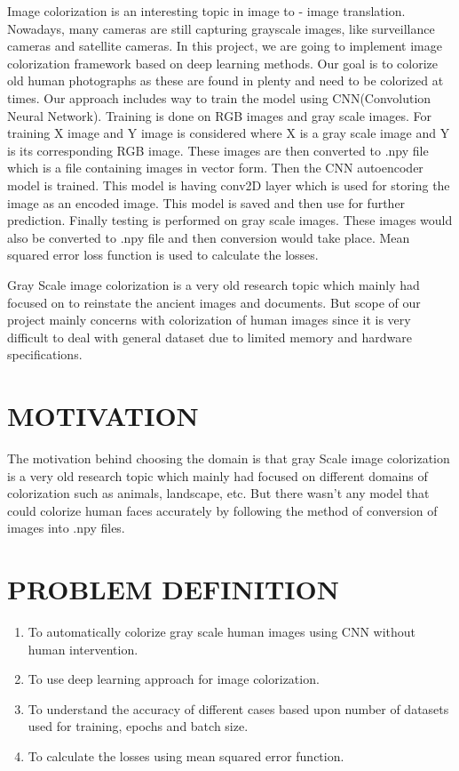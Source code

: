 \documentclass[12pt]{report}	%
\begin{document}
\hspace{2cm}Image colorization is an interesting topic in image to - image translation. Nowadays, many cameras are still capturing grayscale images, like surveillance cameras and satellite cameras. In this project, we are going to implement image colorization framework based on deep learning methods. Our goal is to colorize old human photographs as these are found in plenty and need to be colorized at times. Our approach includes way to train the model using CNN(Convolution Neural Network). Training is done on RGB images and gray scale images. For training X image and Y image is considered where X is a gray scale image and Y is its corresponding RGB image. These images are then converted to .npy file which is a file containing images in vector form. Then the CNN autoencoder model is trained. This model is having conv2D layer which is used for storing the image as an encoded image. This model is saved and then use for further prediction. Finally testing is performed on gray scale images. These images would also be converted to .npy file and then conversion would take place. Mean squared error loss function is used to calculate the losses.
\par{\hspace{2cm}}Gray Scale image colorization is a very old research topic which mainly had focused on to reinstate the ancient images and documents. But scope of our project mainly concerns with colorization of human images since it is very difficult to deal with general dataset due to limited memory and hardware specifications.

\vspace{2 in}
\section{MOTIVATION}
The motivation behind choosing the domain is that gray Scale image colorization is a very old research topic which mainly had focused on different domains of colorization such as animals, landscape, etc. But there wasn’t any model that could colorize human faces accurately by following the method of conversion of images into .npy files. 




\section{PROBLEM DEFINITION}
\begin{enumerate}
\item To automatically colorize gray scale human images using CNN without human intervention.
\item To use deep learning approach for image colorization.
\item To understand the accuracy of different cases based upon number of datasets used for training, epochs and batch size.
\item To calculate the losses using mean squared error function.
\end{enumerate}
\end{document}
